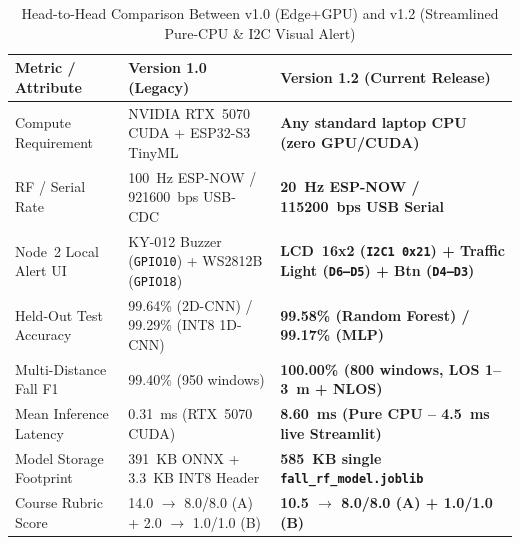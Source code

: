 \documentclass{hcmut-report}
\begin{document}
\begin{table}[H]
\centering
\caption{Head-to-Head Comparison Between v1.0 (Edge+GPU) and v1.2 (Streamlined Pure-CPU \& I2C Visual Alert)}
\label{tab:v10_v12_compare}
\footnotesize
\begin{tabularx}{\textwidth}{|P{3.6cm}|P{4.4cm}|Y|}
\hline
\textbf{Metric / Attribute} & \textbf{Version 1.0 (Legacy)} & \textbf{Version 1.2 (Current Release)} \\
\hline
Compute Requirement & NVIDIA RTX~5070 CUDA + ESP32-S3 TinyML & \textbf{Any standard laptop CPU (zero GPU/CUDA)} \\
\hline
RF / Serial Rate & 100~Hz ESP-NOW / 921600~bps USB-CDC & \textbf{20~Hz ESP-NOW / 115200~bps USB Serial} \\
\hline
Node~2 Local Alert UI & KY-012 Buzzer (\texttt{GPIO10}) + WS2812B (\texttt{GPIO18}) & \textbf{LCD~16x2 (\texttt{I2C1 0x21}) + Traffic Light (\texttt{D6--D5}) + Btn (\texttt{D4--D3})} \\
\hline
Held-Out Test Accuracy & 99.64\% (2D-CNN) / 99.29\% (INT8 1D-CNN) & \textbf{99.58\% (Random Forest) / 99.17\% (MLP)} \\
\hline
Multi-Distance Fall F1 & 99.40\% (950 windows) & \textbf{100.00\% (800 windows, LOS 1--3~m + NLOS)} \\
\hline
Mean Inference Latency & 0.31~ms (RTX~5070 CUDA) & \textbf{8.60~ms (Pure CPU -- 4.5~ms live Streamlit)} \\
\hline
Model Storage Footprint & 391~KB ONNX + 3.3~KB INT8 Header & \textbf{585~KB single \texttt{fall\_rf\_model.joblib}} \\
\hline
Course Rubric Score & 14.0 $\rightarrow$ 8.0/8.0 (A) + 2.0 $\rightarrow$ 1.0/1.0 (B) & \textbf{10.5 $\rightarrow$ 8.0/8.0 (A) + 1.0/1.0 (B)} \\
\hline
\end{tabularx}
\end{table}
\end{document}
